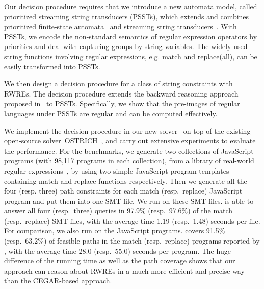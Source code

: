 {%
Our decision procedure requires that we introduce a new automata model, called 
prioritized streaming string transducers (PSSTs), which extends and combines 
prioritized finite-state automata~\cite{BM17} and streaming string transducers~\cite{AC10,AD11}. With PSSTs, we encode the non-standard semantics of regular 
expression operators by priorities and deal with capturing groups by string variables. 
The widely used string functions involving regular expressions, e.g. match and replace(all), can be easily transformed into PSSTs. 

We then design a decision procedure for a class of string constraints with RWREs. The decision procedure extends the backward reasoning approach proposed in~\cite{CHL+19} to PSSTs. Specifically, we show that the pre-images of regular languages under PSSTs are regular and can be computed effectively. 

We implement the decision procedure in our new solver \ostrich\  
on top of the existing open-source solver~OSTRICH~\cite{CHL+19},
 and carry out extensive experiments to evaluate the performance. For the benchmarks, we generate two collections of JavaScript programs (with 98,117 programs in each collection), from a library of real-world regular expressions~\cite{DMC+19}, by using two simple JavaScript program templates containing match and replace functions respectively.  
 Then we generate all the four (resp. three) path constraints for each match (resp.\ replace) JavaScript program and put them into one SMT file. We run {\ostrich} on these SMT files. {\ostrich} is able to answer all four (resp.\ three) queries in 97.9\% (resp.\ 97.6\%) of the match (resp.\ replace) SMT files, with the average time 1.19 (resp.\ 1.48) seconds per file. For comparison, we also run \expose{} on the JavaScript programs. \expose{} covers 91.5\% (resp.\ 63.2\%) of feasible paths in the match (resp.\ replace) programs reported by {\ostrich}, with  the average time 28.0 (resp.\ 55.0) seconds per program. The huge difference of the running time as well as the path coverage shows that our approach can reason about RWREs in a much more efficient and precise way than the CEGAR-based approach. 
 }



